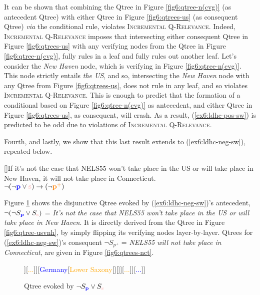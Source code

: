 It can be shown that combining the Qtree in Figure \ref{fig6:qtree-n(cvg)} (as antecedent Qtree) with either Qtree in Figure \ref{fig6:qtrees-us} (as consequent Qtree) \textit{via} the conditional rule, violates \textsc{Incremental Q-Relevance}. Indeed, \textsc{Incremental Q-Relevance} imposes that intersecting either consequent Qtree in Figure \ref{fig6:qtrees-us} with any verifying nodes from the Qtree in Figure \ref{fig6:qtree-n(cvg)}, fully rules in a leaf and fully rules out another leaf. Let's consider the \textit{New Haven} node, which is verifying in Figure \ref{fig6:qtree-n(cvg)}. This node strictly entails \textit{the US}, and so, intersecting the \textit{New Haven} node with any Qtree from Figure \ref{fig6:qtrees-us}, does not rule in any leaf, and so violates \textsc{Incremental Q-Relevance}. This is enough to predict that the formation of a conditional based on Figure \ref{fig6:qtree-n(cvg)} as antecedent, and either Qtree in Figure \ref{fig6:qtrees-us}, as consequent, will crash. As a result, (\ref{ex6:ldhc-pos-sw}) is predicted to be odd due to violations of \textsc{Incremental Q-Relevance}.

Fourth, and lastly, we show that this last result extends to (\ref{ex6:ldhc-neg-sw}), repeated below.

\begin{exe}
	[]{If it's not the case that NELS55 won't take place in the US or will take place in New Haven, it will not take place in Connecticut.\\
		$\neg(\neg \p \vee \s) \rightarrow(\neg \pplus)$}
\end{exe}

Figure \ref{fig6:qtree-n(usvnh)}  shows the disjunctive Qtree evoked by (\ref{ex6:ldhc-neg-sw})'s antecedent, $\neg (\neg S_{\p} \vee S_{\s})$ = \textit{It's not the case that NELS55 won't take place in the US or will take place in New Haven}. It is directly derived from the Qtree in Figure \ref{fig6:qtree-usvnh}, by simply flipping its verifying nodes layer-by-layer. Qtrees for (\ref{ex6:ldhc-neg-sw})'s consequent $\neg S_{p^+}$ = \textit{NELS55 will not take place in Connecticut}, are given in Figure \ref{fig6:qtrees-nct}. 


\begin{figure}[H]
	\centering
	\begin{forest}
		[CS[\fbox{\textcolor{blue}{US}}[{\textcolor{orange}{Connecticut}}[{\textcolor{pink}{New Haven}}][\fbox{\textcolor{pink}{...}}]][\textcolor{orange}{...}]][{\textcolor{blue}{Germany}}[\textcolor{orange}{Lower Saxony}[\fbox{\textcolor{pink}{Gottingen}}][\fbox{\textcolor{pink}{...}}]][\textcolor{orange}{...}]][{\textcolor{blue}{...}}]]
	\end{forest}
	\caption[]{Qtree evoked by $\neg S_{\p} \vee S_{\s}$}\label{fig6:qtree-n(usvnh)}
\end{figure}

